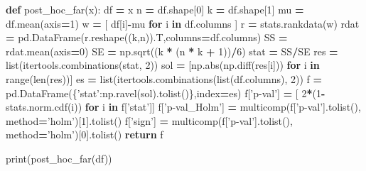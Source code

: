 \documentclass[polish,]{book}
\newenvironment{Shaded}{\begin{snugshade}}{\end{snugshade}}
\newcommand{\BuiltInTok}[1]{#1}
\newcommand{\ControlFlowTok}[1]{\textcolor[rgb]{0.13,0.29,0.53}{\textbf{#1}}}
\newcommand{\DecValTok}[1]{\textcolor[rgb]{0.00,0.00,0.81}{#1}}
\newcommand{\KeywordTok}[1]{\textcolor[rgb]{0.13,0.29,0.53}{\textbf{#1}}}
\newcommand{\NormalTok}[1]{#1}
\newcommand{\OperatorTok}[1]{\textcolor[rgb]{0.81,0.36,0.00}{\textbf{#1}}}
\newcommand{\StringTok}[1]{\textcolor[rgb]{0.31,0.60,0.02}{#1}}
\begin{document}
\begin{Shaded}
\begin{Highlighting}[]
\KeywordTok{def}\NormalTok{ post_hoc_far(x):}
\NormalTok{    df }\OperatorTok{=}\NormalTok{ x}
\NormalTok{    n }\OperatorTok{=}\NormalTok{ df.shape[}\DecValTok{0}\NormalTok{]}
\NormalTok{    k }\OperatorTok{=}\NormalTok{ df.shape[}\DecValTok{1}\NormalTok{]}
\NormalTok{    mu }\OperatorTok{=}\NormalTok{ df.mean(axis}\OperatorTok{=}\DecValTok{1}\NormalTok{)}
\NormalTok{    w }\OperatorTok{=}\NormalTok{ [ df[i]}\OperatorTok{-}\NormalTok{mu }\ControlFlowTok{for}\NormalTok{ i }\KeywordTok{in}\NormalTok{ df.columns ]}
\NormalTok{    r }\OperatorTok{=}\NormalTok{ stats.rankdata(w)}
\NormalTok{    rdat }\OperatorTok{=}\NormalTok{ pd.DataFrame(r.reshape((k,n)).T,columns}\OperatorTok{=}\NormalTok{df.columns)}
\NormalTok{    SS }\OperatorTok{=}\NormalTok{ rdat.mean(axis}\OperatorTok{=}\DecValTok{0}\NormalTok{)}
\NormalTok{    SE }\OperatorTok{=}\NormalTok{ np.sqrt((k }\OperatorTok{*}\NormalTok{ (n }\OperatorTok{*}\NormalTok{ k }\OperatorTok{+} \DecValTok{1}\NormalTok{))}\OperatorTok{/}\DecValTok{6}\NormalTok{)}
\NormalTok{    stat }\OperatorTok{=}\NormalTok{ SS}\OperatorTok{/}\NormalTok{SE}
\NormalTok{    res }\OperatorTok{=} \BuiltInTok{list}\NormalTok{(itertools.combinations(stat, }\DecValTok{2}\NormalTok{))}
\NormalTok{    sol }\OperatorTok{=}\NormalTok{ [np.}\BuiltInTok{abs}\NormalTok{(np.diff(res[i])) }\ControlFlowTok{for}\NormalTok{ i }\KeywordTok{in} \BuiltInTok{range}\NormalTok{(}\BuiltInTok{len}\NormalTok{(res))]}
\NormalTok{    es }\OperatorTok{=} \BuiltInTok{list}\NormalTok{(itertools.combinations(}\BuiltInTok{list}\NormalTok{(df.columns), }\DecValTok{2}\NormalTok{))}
\NormalTok{    f }\OperatorTok{=}\NormalTok{ pd.DataFrame(\{}\StringTok{'stat'}\NormalTok{:np.ravel(sol).tolist()\},index}\OperatorTok{=}\NormalTok{es)}
\NormalTok{    f[}\StringTok{'p-val'}\NormalTok{] }\OperatorTok{=}\NormalTok{ [ }\DecValTok{2}\OperatorTok{*}\NormalTok{(}\DecValTok{1}\OperatorTok{-}\NormalTok{stats.norm.cdf(i)) }\ControlFlowTok{for}\NormalTok{ i }\KeywordTok{in}\NormalTok{ f[}\StringTok{'stat'}\NormalTok{]]}
\NormalTok{    f[}\StringTok{'p-val_Holm'}\NormalTok{] }\OperatorTok{=}\NormalTok{ multicomp(f[}\StringTok{'p-val'}\NormalTok{].tolist(), method}\OperatorTok{=}\StringTok{'holm'}\NormalTok{)[}\DecValTok{1}\NormalTok{].tolist()}
\NormalTok{    f[}\StringTok{'sign'}\NormalTok{] }\OperatorTok{=}\NormalTok{ multicomp(f[}\StringTok{'p-val'}\NormalTok{].tolist(), method}\OperatorTok{=}\StringTok{'holm'}\NormalTok{)[}\DecValTok{0}\NormalTok{].tolist()}
    \ControlFlowTok{return}\NormalTok{ f}
    
\BuiltInTok{print}\NormalTok{(post_hoc_far(df))}
\end{Highlighting}
\end{Shaded}
\end{document}
